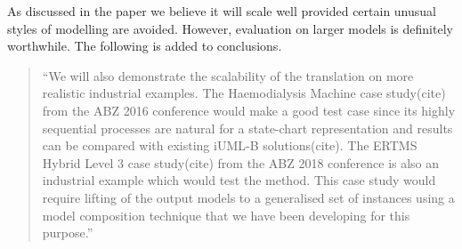 \documentclass{response}
\begin{document}


\begin{comment}{Reviewer \#1}
Contribution:
Authors present an encoding scheme to be able to handle the
abstraction (and refinement) of statechart models. The contribution is
mainly focused onto the special encoding and the implementation. The
contribution is enough for a workshop paper and it could be a nice
piece of work to be shown in the workshop.
However, the approach seems not to scale well, so I would suggest the
authors evaluate their work using more complex (industrial)
verification problems.
\end{comment}

\begin{response}
  As discussed in the paper we believe it will scale well provided certain unusual styles of modelling are avoided. 
  However, evaluation on larger models is definitely worthwhile.
  The following is added to conclusions.
  \begin{quote}
    ``We will also demonstrate the scalability of the translation on
    more realistic industrial examples. The Haemodialysis Machine case
    study(cite) from the ABZ 2016 conference would make a good test
    case since its highly sequential processes are natural for a
    state-chart representation and results can be compared with
    existing iUML-B solutions(cite). The ERTMS Hybrid Level 3 case
    study(cite) from the ABZ 2018 conference is also an industrial
    example which would test the method. This case study would require
    lifting of the output models to a generalised set of instances
    using a model composition technique that we have been developing
    for this purpose.''
  \end{quote}
\end{response}

\end{document}

